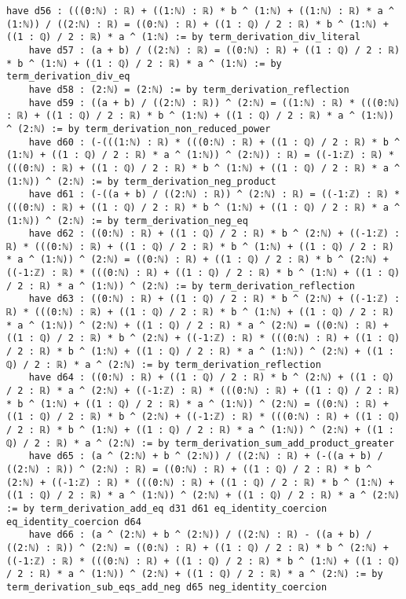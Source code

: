 \documentclass{article}
\begin{document}
\begin{tcolorbox}[colback=white!10, width=\linewidth]
\begin{lstlisting}[language=Lean4]
    have d56 : (((0:ℕ) : ℝ) + ((1:ℕ) : ℝ) * b ^ (1:ℕ) + ((1:ℕ) : ℝ) * a ^ (1:ℕ)) / ((2:ℕ) : ℝ) = ((0:ℕ) : ℝ) + ((1 : ℚ) / 2 : ℝ) * b ^ (1:ℕ) + ((1 : ℚ) / 2 : ℝ) * a ^ (1:ℕ) := by term_derivation_div_literal
    have d57 : (a + b) / ((2:ℕ) : ℝ) = ((0:ℕ) : ℝ) + ((1 : ℚ) / 2 : ℝ) * b ^ (1:ℕ) + ((1 : ℚ) / 2 : ℝ) * a ^ (1:ℕ) := by term_derivation_div_eq
    have d58 : (2:ℕ) = (2:ℕ) := by term_derivation_reflection
    have d59 : ((a + b) / ((2:ℕ) : ℝ)) ^ (2:ℕ) = ((1:ℕ) : ℝ) * (((0:ℕ) : ℝ) + ((1 : ℚ) / 2 : ℝ) * b ^ (1:ℕ) + ((1 : ℚ) / 2 : ℝ) * a ^ (1:ℕ)) ^ (2:ℕ) := by term_derivation_non_reduced_power
    have d60 : (-(((1:ℕ) : ℝ) * (((0:ℕ) : ℝ) + ((1 : ℚ) / 2 : ℝ) * b ^ (1:ℕ) + ((1 : ℚ) / 2 : ℝ) * a ^ (1:ℕ)) ^ (2:ℕ)) : ℝ) = ((-1:ℤ) : ℝ) * (((0:ℕ) : ℝ) + ((1 : ℚ) / 2 : ℝ) * b ^ (1:ℕ) + ((1 : ℚ) / 2 : ℝ) * a ^ (1:ℕ)) ^ (2:ℕ) := by term_derivation_neg_product
    have d61 : (-((a + b) / ((2:ℕ) : ℝ)) ^ (2:ℕ) : ℝ) = ((-1:ℤ) : ℝ) * (((0:ℕ) : ℝ) + ((1 : ℚ) / 2 : ℝ) * b ^ (1:ℕ) + ((1 : ℚ) / 2 : ℝ) * a ^ (1:ℕ)) ^ (2:ℕ) := by term_derivation_neg_eq
    have d62 : ((0:ℕ) : ℝ) + ((1 : ℚ) / 2 : ℝ) * b ^ (2:ℕ) + ((-1:ℤ) : ℝ) * (((0:ℕ) : ℝ) + ((1 : ℚ) / 2 : ℝ) * b ^ (1:ℕ) + ((1 : ℚ) / 2 : ℝ) * a ^ (1:ℕ)) ^ (2:ℕ) = ((0:ℕ) : ℝ) + ((1 : ℚ) / 2 : ℝ) * b ^ (2:ℕ) + ((-1:ℤ) : ℝ) * (((0:ℕ) : ℝ) + ((1 : ℚ) / 2 : ℝ) * b ^ (1:ℕ) + ((1 : ℚ) / 2 : ℝ) * a ^ (1:ℕ)) ^ (2:ℕ) := by term_derivation_reflection
    have d63 : ((0:ℕ) : ℝ) + ((1 : ℚ) / 2 : ℝ) * b ^ (2:ℕ) + ((-1:ℤ) : ℝ) * (((0:ℕ) : ℝ) + ((1 : ℚ) / 2 : ℝ) * b ^ (1:ℕ) + ((1 : ℚ) / 2 : ℝ) * a ^ (1:ℕ)) ^ (2:ℕ) + ((1 : ℚ) / 2 : ℝ) * a ^ (2:ℕ) = ((0:ℕ) : ℝ) + ((1 : ℚ) / 2 : ℝ) * b ^ (2:ℕ) + ((-1:ℤ) : ℝ) * (((0:ℕ) : ℝ) + ((1 : ℚ) / 2 : ℝ) * b ^ (1:ℕ) + ((1 : ℚ) / 2 : ℝ) * a ^ (1:ℕ)) ^ (2:ℕ) + ((1 : ℚ) / 2 : ℝ) * a ^ (2:ℕ) := by term_derivation_reflection
    have d64 : ((0:ℕ) : ℝ) + ((1 : ℚ) / 2 : ℝ) * b ^ (2:ℕ) + ((1 : ℚ) / 2 : ℝ) * a ^ (2:ℕ) + ((-1:ℤ) : ℝ) * (((0:ℕ) : ℝ) + ((1 : ℚ) / 2 : ℝ) * b ^ (1:ℕ) + ((1 : ℚ) / 2 : ℝ) * a ^ (1:ℕ)) ^ (2:ℕ) = ((0:ℕ) : ℝ) + ((1 : ℚ) / 2 : ℝ) * b ^ (2:ℕ) + ((-1:ℤ) : ℝ) * (((0:ℕ) : ℝ) + ((1 : ℚ) / 2 : ℝ) * b ^ (1:ℕ) + ((1 : ℚ) / 2 : ℝ) * a ^ (1:ℕ)) ^ (2:ℕ) + ((1 : ℚ) / 2 : ℝ) * a ^ (2:ℕ) := by term_derivation_sum_add_product_greater
    have d65 : (a ^ (2:ℕ) + b ^ (2:ℕ)) / ((2:ℕ) : ℝ) + (-((a + b) / ((2:ℕ) : ℝ)) ^ (2:ℕ) : ℝ) = ((0:ℕ) : ℝ) + ((1 : ℚ) / 2 : ℝ) * b ^ (2:ℕ) + ((-1:ℤ) : ℝ) * (((0:ℕ) : ℝ) + ((1 : ℚ) / 2 : ℝ) * b ^ (1:ℕ) + ((1 : ℚ) / 2 : ℝ) * a ^ (1:ℕ)) ^ (2:ℕ) + ((1 : ℚ) / 2 : ℝ) * a ^ (2:ℕ) := by term_derivation_add_eq d31 d61 eq_identity_coercion eq_identity_coercion d64
    have d66 : (a ^ (2:ℕ) + b ^ (2:ℕ)) / ((2:ℕ) : ℝ) - ((a + b) / ((2:ℕ) : ℝ)) ^ (2:ℕ) = ((0:ℕ) : ℝ) + ((1 : ℚ) / 2 : ℝ) * b ^ (2:ℕ) + ((-1:ℤ) : ℝ) * (((0:ℕ) : ℝ) + ((1 : ℚ) / 2 : ℝ) * b ^ (1:ℕ) + ((1 : ℚ) / 2 : ℝ) * a ^ (1:ℕ)) ^ (2:ℕ) + ((1 : ℚ) / 2 : ℝ) * a ^ (2:ℕ) := by term_derivation_sub_eqs_add_neg d65 neg_identity_coercion

\end{lstlisting}
\end{tcolorbox}
\end{document}
